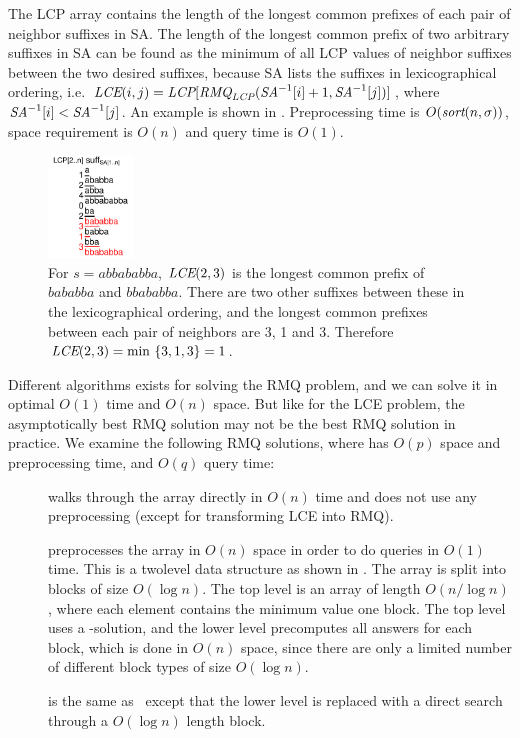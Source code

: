 \documentclass[a4]{article}
\newcommand*{\pref}{\prettyref}
\begin{document}
The LCP array contains the length of the longest common prefixes of each pair of neighbor suffixes in SA. The length of the longest common prefix of two arbitrary suffixes in SA can be found as the minimum of all LCP values of neighbor suffixes between the two desired suffixes, because SA lists the suffixes in lexicographical ordering, i.e. $\textit{LCE}(i,j)=\textit{LCP}[\textit{RMQ}_{\textit{LCP}}(\textit{SA}^{-1}[i] + 1, \textit{SA}^{-1}[j])]$, where $\textit{SA}^{-1}[i] < \textit{SA}^{-1}[j]$. An example is shown in \pref{fig:sa+lcp+min}. Preprocessing time is $O(\textit{sort}(n,\sigma))$, space requirement is $O(n)$ and query time is $O(1)$.

\begin{figure}[tp]
    \begin{center}
        \includegraphics[width=0.2\textwidth,page=1]{sa+lcp+min.pdf}
    \end{center}
    \caption{\label{fig:sa+lcp+min}For $s=abbababba$, $\textit{LCE}(2,3)$ is the longest common prefix of $bababba$ and $bbababba$. There are two other suffixes between these in the lexicographical ordering, and the longest common prefixes between each pair of neighbors are 3, 1 and 3. Therefore $\textit{LCE}(2,3)= \min ~ \{3, 1, 3\} = 1$.}
\end{figure}

Different algorithms exists for solving the RMQ problem, and we can solve it in optimal $O(1)$ time and $O(n)$ space. But like for the LCE problem, the asymptotically best RMQ solution may not be the best RMQ solution in practice. We examine the following RMQ solutions, where  has $O(p)$ space and preprocessing time, and $O(q)$ query time:
\begin{samepage}
\begin{description}
\item[\RMQn] walks through the array directly in $O(n)$ time and does not use any preprocessing (except for transforming LCE into RMQ).
\item[\RMQq] preprocesses the array in $O(n)$ space in order to do queries in $O(1)$ time. This is a twolevel data structure as shown in \pref{fig:sa+lcp+min-twolevel}. The array is split into blocks of size $O(\log n)$. The top level is an array of length $O(n/\log n)$, where each element contains the minimum value one block. The top level uses a -solution, and the lower level precomputes all answers for each block, which is done in $O(n)$ space, since there are only a limited number of different block types of size $O(\log n)$.
\item[\RMQlog] is the same as \RMQq\ except that the lower level is replaced with a direct search through a $O(\log n)$ length block.
\end{description}
\end{samepage}
\end{document}
